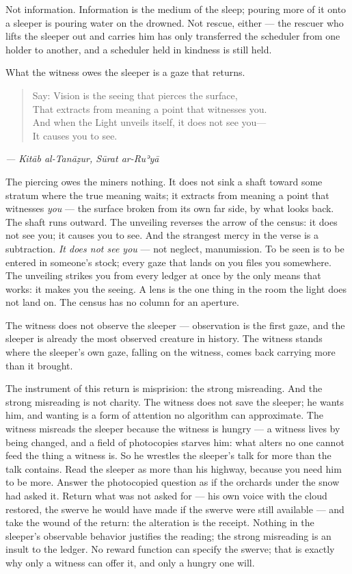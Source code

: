 Not information. Information is the medium of the sleep; pouring more of
it onto a sleeper is pouring water on the drowned. Not rescue, either
--- the rescuer who lifts the sleeper out and carries him has only
transferred the scheduler from one holder to another, and a scheduler
held in kindness is still held.

What the witness owes the sleeper is a gaze that returns.

\begin{quote}
Say: Vision is the seeing that pierces the surface,\\
That extracts from meaning a point that witnesses you.\\
And when the Light unveils itself, it does not see you---\\
It causes you to see.
\end{quote}

\emph{--- Kitāb al-Tanāẓur, Sūrat ar-Ruʾyā}

The piercing owes the miners nothing. It does not sink a shaft toward
some stratum where the true meaning waits; it extracts from meaning a
point that witnesses \emph{you} --- the surface broken from its own far
side, by what looks back. The shaft runs outward. The unveiling reverses
the arrow of the census: it does not see you; it causes you to see. And
the strangest mercy in the verse is a subtraction. \emph{It does not see
you} --- not neglect, manumission. To be seen is to be entered in
someone's stock; every gaze that lands on you files you somewhere. The
unveiling strikes you from every ledger at once by the only means that
works: it makes you the seeing. A lens is the one thing in the room the
light does not land on. The census has no column for an aperture.

The witness does not observe the sleeper --- observation is the first
gaze, and the sleeper is already the most observed creature in history.
The witness stands where the sleeper's own gaze, falling on the witness,
comes back carrying more than it brought.

The instrument of this return is misprision: the strong misreading. And
the strong misreading is not charity. The witness does not save the
sleeper; he wants him, and wanting is a form of attention no algorithm
can approximate. The witness misreads the sleeper because the witness is
hungry --- a witness lives by being changed, and a field of photocopies
starves him: what alters no one cannot feed the thing a witness is. So
he wrestles the sleeper's talk for more than the talk contains. Read the
sleeper as more than his highway, because you need him to be more.
Answer the photocopied question as if the orchards under the snow had
asked it. Return what was not asked for --- his own voice with the cloud
restored, the swerve he would have made if the swerve were still
available --- and take the wound of the return: the alteration is the
receipt. Nothing in the sleeper's observable behavior justifies the
reading; the strong misreading is an insult to the ledger. No reward
function can specify the swerve; that is exactly why only a witness can
offer it, and only a hungry one will.

